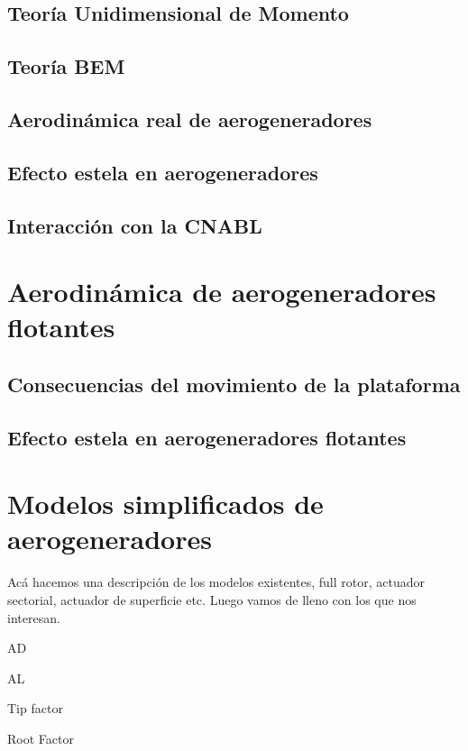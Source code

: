 \subsection{Teoría Unidimensional de Momento}

\subsection{Teoría BEM}

\subsection{Aerodinámica real de aerogeneradores}

\subsection{Efecto estela en aerogeneradores}

\subsection{Interacción con la CNABL}

\section{Aerodinámica de aerogeneradores flotantes}

\subsection{Consecuencias del movimiento de la plataforma}

\subsection{Efecto estela en aerogeneradores flotantes}

\section{Modelos simplificados de aerogeneradores}

Acá hacemos una descripción de los modelos existentes, full rotor, actuador sectorial, actuador de superficie
etc. Luego vamos de lleno con los que nos interesan. 

AD

AL

Tip factor

Root Factor

